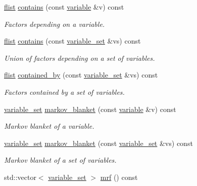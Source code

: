 \begin{DoxyCompactItemize}
\hyperlink{classmerlin_1_1graphical__model_a615e25ec6594615fddfd4c3c4776b99f}{flist} \hyperlink{classmerlin_1_1graphical__model_ad2febd01b65cab5c41a85ed2850a58dd}{contains} (const \hyperlink{classmerlin_1_1variable}{variable} \&v) const 
\begin{DoxyCompactList}\small\item\em Factors depending on a variable. \end{DoxyCompactList}\item 
\hyperlink{classmerlin_1_1graphical__model_a615e25ec6594615fddfd4c3c4776b99f}{flist} \hyperlink{classmerlin_1_1graphical__model_aafb1db01ca3f08e67bfc0bf0a01e9214}{contains} (const \hyperlink{classmerlin_1_1variable__set}{variable\+\_\+set} \&vs) const 
\begin{DoxyCompactList}\small\item\em Union of factors depending on a set of variables. \end{DoxyCompactList}\item 
\hyperlink{classmerlin_1_1graphical__model_a615e25ec6594615fddfd4c3c4776b99f}{flist} \hyperlink{classmerlin_1_1graphical__model_a399c5636919586bdaeeda03707ed9ba6}{contained\+\_\+by} (const \hyperlink{classmerlin_1_1variable__set}{variable\+\_\+set} \&vs) const 
\begin{DoxyCompactList}\small\item\em Factors contained by a set of variables. \end{DoxyCompactList}\item 
\hyperlink{classmerlin_1_1variable__set}{variable\+\_\+set} \hyperlink{classmerlin_1_1graphical__model_abedcfa3faf1b0c76465f44a24de37e75}{markov\+\_\+blanket} (const \hyperlink{classmerlin_1_1variable}{variable} \&v) const 
\begin{DoxyCompactList}\small\item\em Markov blanket of a variable. \end{DoxyCompactList}\item 
\hyperlink{classmerlin_1_1variable__set}{variable\+\_\+set} \hyperlink{classmerlin_1_1graphical__model_af6b2d0ec1085f9318dec785c3d47e3a3}{markov\+\_\+blanket} (const \hyperlink{classmerlin_1_1variable__set}{variable\+\_\+set} \&vs) const 
\begin{DoxyCompactList}\small\item\em Markov blanket of a set of variables. \end{DoxyCompactList}\item 
std\+::vector$<$ \hyperlink{classmerlin_1_1variable__set}{variable\+\_\+set} $>$ \hyperlink{classmerlin_1_1graphical__model_ac27c6c49cb3f55fa248c0a4adba2cb92}{mrf} () const 

\end{DoxyCompactItemize}
